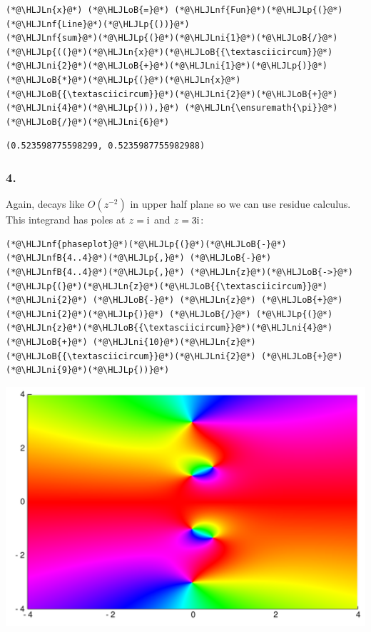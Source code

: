 \documentclass[12pt,a4paper]{article}
\newcommand{\HLJLn}[1]{#1}
\newcommand{\HLJLnf}[1]{\textcolor[RGB]{66,102,213}{#1}}
\newcommand{\HLJLnfB}[1]{\textcolor[RGB]{59,151,46}{#1}}
\newcommand{\HLJLni}[1]{\textcolor[RGB]{59,151,46}{#1}}
\newcommand{\HLJLoB}[1]{\textcolor[RGB]{102,102,102}{\textbf{#1}}}
\newcommand{\HLJLp}[1]{#1}
\def\I{ {\rm i} }
\begin{document}
\begin{lstlisting}
(*@\HLJLn{x}@*) (*@\HLJLoB{=}@*) (*@\HLJLnf{Fun}@*)(*@\HLJLp{(}@*) (*@\HLJLnf{Line}@*)(*@\HLJLp{())}@*)
(*@\HLJLnf{sum}@*)(*@\HLJLp{(}@*)(*@\HLJLni{1}@*)(*@\HLJLoB{/}@*)(*@\HLJLp{((}@*)(*@\HLJLn{x}@*)(*@\HLJLoB{{\textasciicircum}}@*)(*@\HLJLni{2}@*)(*@\HLJLoB{+}@*)(*@\HLJLni{1}@*)(*@\HLJLp{)}@*)(*@\HLJLoB{*}@*)(*@\HLJLp{(}@*)(*@\HLJLn{x}@*)(*@\HLJLoB{{\textasciicircum}}@*)(*@\HLJLni{2}@*)(*@\HLJLoB{+}@*)(*@\HLJLni{4}@*)(*@\HLJLp{))),}@*) (*@\HLJLn{\ensuremath{\pi}}@*)(*@\HLJLoB{/}@*)(*@\HLJLni{6}@*)
\end{lstlisting}

\begin{lstlisting}
(0.523598775598299, 0.5235987755982988)
\end{lstlisting}


\subsubsection{4.}
Again, decays like $O(z^{-2})$ in upper half plane so we can use residue calculus. This integrand has poles at $z = \I$ and $z = 3 \I$:


\begin{lstlisting}
(*@\HLJLnf{phaseplot}@*)(*@\HLJLp{(}@*)(*@\HLJLoB{-}@*)(*@\HLJLnfB{4..4}@*)(*@\HLJLp{,}@*) (*@\HLJLoB{-}@*)(*@\HLJLnfB{4..4}@*)(*@\HLJLp{,}@*) (*@\HLJLn{z}@*)(*@\HLJLoB{->}@*) (*@\HLJLp{(}@*)(*@\HLJLn{z}@*)(*@\HLJLoB{{\textasciicircum}}@*)(*@\HLJLni{2}@*) (*@\HLJLoB{-}@*) (*@\HLJLn{z}@*) (*@\HLJLoB{+}@*) (*@\HLJLni{2}@*)(*@\HLJLp{)}@*) (*@\HLJLoB{/}@*) (*@\HLJLp{(}@*)(*@\HLJLn{z}@*)(*@\HLJLoB{{\textasciicircum}}@*)(*@\HLJLni{4}@*) (*@\HLJLoB{+}@*) (*@\HLJLni{10}@*)(*@\HLJLn{z}@*)(*@\HLJLoB{{\textasciicircum}}@*)(*@\HLJLni{2}@*) (*@\HLJLoB{+}@*)(*@\HLJLni{9}@*)(*@\HLJLp{))}@*)
\end{lstlisting}

\includegraphics[width=\linewidth]{figures/Solutions1_8_1.pdf}
\end{document}
